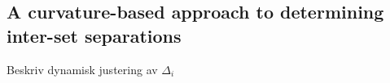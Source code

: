 \subsection{A curvature-based approach to determining inter-set separations}
\label{sub:a_curvature_based_approach_to_determining_inter_set_separations}


\begin{framed}
    Beskriv dynamisk justering av $\Delta_{i}$
\end{framed}



